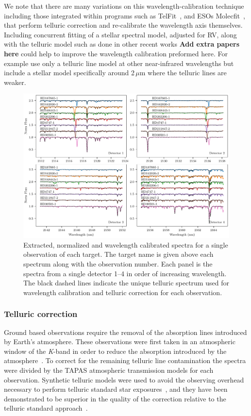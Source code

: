 \documentclass[fleqn,usenatbib]{mnras}
\newcommand*\rd{\color{red}}
\begin{document}
We note that there are many variations on this wavelength-calibration technique including those integrated within programs such as TelFit~\citet{gullikson_correcting_2014}, and ESOs Molecfit~\citet{smette_molecfit_2015}, that perform telluric correction and re-calibrate the wavelength axis themselves. {\rd Including concurrent fitting of a stellar spectral model, adjusted for RV, along with the telluric model such as done in other recent works \citep[e.g.][]{}\textbf{Add extra papers here} could help to improve the wavelength calibration preformed here. For example \citet{piskorz_evidence_2016} use only a telluric line model at other near-infrared wavelengths but include a stellar model specifically around 2\,$\mu$m where the telluric lines are weaker.}


\begin{figure}
    \includegraphics[width=\hsize]{images/Spectra_examples.pdf}
    \caption{Extracted, normalized and wavelength calibrated spectra for a single observation of each target. The target name is given above each spectrum along with the observation number. Each panel is the spectra from a single detector 1--4 in order of increasing wavelength. The black dashed lines indicate the unique telluric spectrum used for wavelength calibration and telluric correction for each observation.}
    \label{fig:detector4allspectra}
\end{figure}


\subsubsection{Telluric correction}
\label{subsec:telluric_correction}
Ground based observations require the removal of the absorption lines introduced by Earth's atmosphere. These observations were first taken in an atmospheric window of the \textit{K}-band in order to reduce the absorption introduced by the atmosphere~\citep{barnes_hd_2008}. To correct for the remaining telluric line contamination the spectra were divided by the TAPAS\citep{bertaux_tapas_2014} atmospheric transmission models for each observation. Synthetic telluric models were used to avoid the observing overhead necessary to perform telluric standard star exposures~\citep{vacca_method_2003}, and they have been demonstrated to be superior in the quality of the correction relative to the telluric standard approach~\citep[e.g.][]{cotton_atmospheric_2014}.
\end{document}
